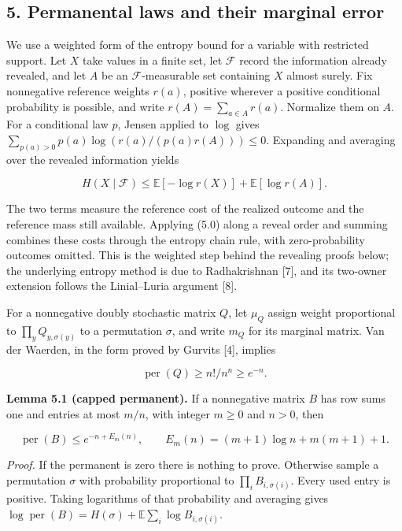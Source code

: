 \documentclass[english,11pt,a4paper]{article}
\begin{document}
\subsection{5. Permanental laws and their marginal error}\label{permanental-laws-and-their-marginal-error}

We use a weighted form of the entropy bound for a variable with restricted support. Let \(X\) take values in a finite set, let \(\mathcal F\) record the information already revealed, and let \(A\) be an \(\mathcal F\)-measurable set containing \(X\) almost surely. Fix nonnegative reference weights \(r(a)\), positive wherever a positive conditional probability is possible, and write \(r(A)=\sum_{a\in A}r(a)\). Normalize them on \(A\). For a conditional law \(p\), Jensen applied to \(\log\) gives \(\sum_{p(a)>0}p(a)\log(r(a)/(p(a)r(A)))\le0\). Expanding and averaging over the revealed information yields

\nopagebreak[4]
\[H(X\mid\mathcal F)\le
\mathbb E[-\log r(X)]+\mathbb E[\log r(A)].\tag{5.0}\]

The two terms measure the reference cost of the realized outcome and the reference mass still available. Applying (5.0) along a reveal order and summing combines these costs through the entropy chain rule, with zero-probability outcomes omitted. This is the weighted step behind the revealing proofs below; the underlying entropy method is due to Radhakrishnan {[}7{]}, and its two-owner extension follows the Linial--Luria argument {[}8{]}.

For a nonnegative doubly stochastic matrix \(Q\), let \(\mu_Q\) assign weight proportional to \(\prod_yQ_{y,\sigma(y)}\) to a permutation \(\sigma\), and write \(m_Q\) for its marginal matrix. Van der Waerden, in the form proved by Gurvits {[}4{]}, implies

\nopagebreak[4]
\[\operatorname{per}(Q)\ge n!/n^n\ge e^{-n}.\tag{5.1}\]

\textbf{Lemma 5.1 (capped permanent).} If a nonnegative matrix \(B\) has row sums one and entries at most \(m/n\), with integer \(m\ge0\) and \(n>0\), then

\nopagebreak[4]
\[\operatorname{per}(B)\le e^{-n+E_m(n)},\qquad
E_m(n)=(m+1)\log n+m(m+1)+1.\tag{5.2}\]

\emph{Proof.} If the permanent is zero there is nothing to prove. Otherwise sample a permutation \(\sigma\) with probability proportional to \(\prod_iB_{i,\sigma(i)}\). Every used entry is positive. Taking logarithms of that probability and averaging gives \(\log\operatorname{per}(B)=H(\sigma)+\mathbb E\sum_i\log B_{i,\sigma(i)}\).
\end{document}

